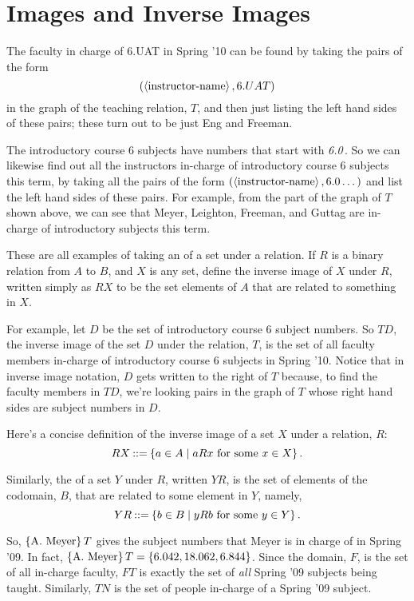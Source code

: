 \section{Images and Inverse Images}

The faculty in charge of 6.UAT in Spring '10 can be found by taking the
pairs of the form
\[
(\left\langle\text{instructor-name}\right\rangle, 6.UAT)
\]
in the graph of the teaching relation, $T$, and then just listing the left
hand sides of these pairs; these turn out to be just Eng and Freeman.

The introductory course 6 subjects have numbers that start with
\emph{6.0}\,.  So we can likewise find out all the instructors in-charge
of introductory course 6 subjects this term, by taking all the pairs of
the form $(\left\langle\text{instructor-name}\right\rangle, 6.0\dots)$ and list the left hand
sides of these pairs.  For example, from the part of the graph of $T$
shown above, we can see that Meyer, Leighton, Freeman, and Guttag are
in-charge of introductory subjects this term.

These are all examples of taking an  of a set under a
relation.  If $R$ is a binary relation from $A$ to $B$, and $X$ is any
set, define the inverse image of $X$ under $R$, written simply as
$RX$ to be the set elements of $A$ that are related to something in $X$.

For example, let $D$ be the set of introductory course 6 subject numbers.
So $TD$, the inverse image of the set $D$ under the relation, $T$, is the
set of all faculty members in-charge of introductory course 6 subjects in
Spring '10.  Notice that in inverse image notation, $D$ gets written to
the right of $T$ because, to find the faculty members in $TD$, we're
looking pairs in the graph of $T$ whose right hand sides are subject
numbers in $D$.

Here's a concise definition of the inverse image of a set $X$ under
a relation, $R$:
\[
RX \mathbin{::=} \left\{a \in A \mid aRx \text{ for some } x \in X\right\}.
\]

Similarly, the  of a set $Y$ under $R$, written $YR$, is the
set of elements of the codomain, $B$, that are related to some element in
$Y$, namely,
\[
YR \mathbin{::=} \left\{b \in B \mid yRb \text{ for some } y \in Y\right\}.
\]

So, $\left\{\text{A. Meyer}\right\}T$ gives the subject numbers that Meyer is in
charge of in Spring '09.  In fact, $\left\{\text{A. Meyer}\right\}T = \left\{6.042,
  18.062, 6.844\right\}$.  Since the domain, $F$, is the set of all in-charge
faculty, $FT$ is exactly the set of \emph{all} Spring '09 subjects being
taught.  Similarly, $TN$ is the set of people in-charge of a Spring '09
subject.

